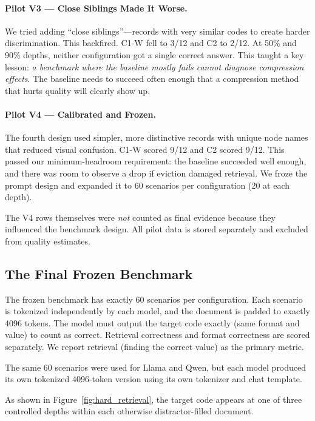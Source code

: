 \documentclass[sigconf,nonacm]{acmart}
\begin{document}
\paragraph{Pilot V3 --- Close Siblings Made It Worse.}
We tried adding ``close siblings''---records with very similar codes to create
harder discrimination. This backfired. C1-W fell to 3/12 and C2 to 2/12. At
50\% and 90\% depths, neither configuration got a single correct answer. This
taught a key lesson: \emph{a benchmark where the baseline mostly fails cannot
diagnose compression effects}. The baseline needs to succeed often enough that a
compression method that hurts quality will clearly show up.

\paragraph{Pilot V4 --- Calibrated and Frozen.}
The fourth design used simpler, more distinctive records with unique node names
that reduced visual confusion. C1-W scored 9/12 and C2 scored 9/12. This passed
our minimum-headroom requirement: the baseline succeeded well enough, and there
was room to observe a drop if eviction damaged retrieval. We froze the prompt
design and expanded it to 60 scenarios per configuration (20 at each depth).

The V4 rows themselves were \emph{not} counted as final evidence because they
influenced the benchmark design. All pilot data is stored separately and excluded
from quality estimates.

\subsection{The Final Frozen Benchmark}

The frozen benchmark has exactly 60 scenarios per configuration. Each scenario is
tokenized independently by each model, and the document is padded to exactly 4096
tokens. The model must output the target code exactly (same format and value) to
count as correct. Retrieval correctness and format correctness are scored
separately. We report retrieval (finding the correct value) as the primary metric.

The same 60 scenarios were used for Llama and Qwen, but each model produced its
own tokenized 4096-token version using its own tokenizer and chat template.

As shown in Figure~\ref{fig:hard_retrieval}, the target code appears at one of
three controlled depths within each otherwise distractor-filled document.
\end{document}
